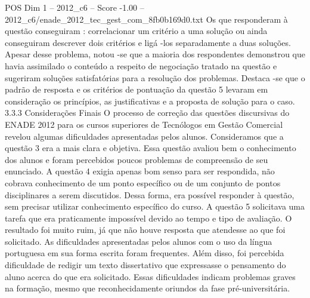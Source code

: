 \begin{textsample}{POS Dim 1 – 2012\_c6 – Score -1.00 – 2012\_c6/enade\_2012\_tec\_gest\_com\_8fb0b169d0.txt}
Os que responderam à questão conseguiram : correlacionar um critério a uma solução ou ainda conseguiram descrever dois critérios e ligá -los separadamente a duas soluções.
Apesar desse problema, notou -se que a maioria dos respondentes demonstrou que havia assimilado o conteúdo a respeito de negociação tratado na questão e sugeriram soluções satisfatórias para a resolução dos problemas.
Destaca -se que o padrão de resposta e os critérios de pontuação da questão 5 levaram em consideração os princípios, as justificativas e a proposta de solução para o caso. 3.3.3 Considerações Finais O processo de correção das questões discursivas do ENADE 2012 para os cursos superiores de Tecnólogos em Gestão Comercial revelou algumas dificuldades apresentadas pelos alunos.
Consideramos que a questão 3 era a mais clara e objetiva.
Essa questão avaliou bem o conhecimento dos alunos e foram percebidos poucos problemas de compreensão de seu enunciado.
A questão 4 exigia apenas bom senso para ser respondida, não cobrava conhecimento de um ponto específico ou de um conjunto de pontos disciplinares a serem discutidos.
Dessa forma, era possível responder à questão, sem precisar utilizar conhecimento específico do curso.
A questão 5 solicitava uma tarefa que era praticamente impossível devido ao tempo e tipo de avaliação.
O resultado foi muito ruim, já que não houve resposta que atendesse ao que foi solicitado.
As dificuldades apresentadas pelos alunos com o uso da língua portuguesa em sua forma escrita foram frequentes.
Além disso, foi percebida dificuldade de redigir um texto dissertativo que expressasse o pensamento do aluno acerca do que era solicitado.
Essas dificuldades indicam problemas graves na formação, mesmo que reconhecidamente oriundos da fase pré-universitária.

\end{textsample}
